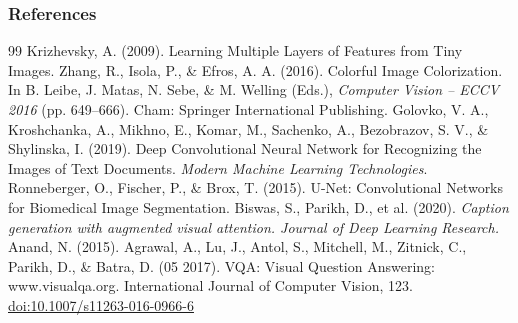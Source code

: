 \documentclass[11pt,compress,t,notes=noshow, xcolor=table]{beamer}
\begin{document}
\begin{vbframe}
\frametitle{References}
\footnotesize{
\begin{thebibliography}{99}
 Krizhevsky, A. (2009). Learning Multiple Layers of Features from Tiny Images.
 Zhang, R., Isola, P., \& Efros, A. A. (2016). Colorful Image Colorization. In B. Leibe, J. Matas, N. Sebe, \& M. Welling (Eds.), \textit{Computer Vision -- ECCV 2016} (pp. 649–666). Cham: Springer International Publishing.
 Golovko, V. A., Kroshchanka, A., Mikhno, E., Komar, M., Sachenko, A., Bezobrazov, S. V., \& Shylinska, I. (2019). Deep Convolutional Neural Network for Recognizing the Images of Text Documents. \textit{Modern Machine Learning Technologies}.
 Ronneberger, O., Fischer, P., \& Brox, T. (2015). U-Net: Convolutional Networks for Biomedical Image Segmentation.
Biswas, S., Parikh, D., et al. (2020). \textit{Caption generation with augmented visual attention. Journal of Deep Learning Research.}
 Anand, N. (2015). Agrawal, A., Lu, J., Antol, S., Mitchell, M., Zitnick, C., Parikh, D., \& Batra, D. (05 2017). VQA: Visual Question Answering: www.visualqa.org. International Journal of Computer Vision, 123. \url{doi:10.1007/s11263-016-0966-6}

\end{thebibliography}
}
\end{vbframe}




\endlecture
\end{document}
